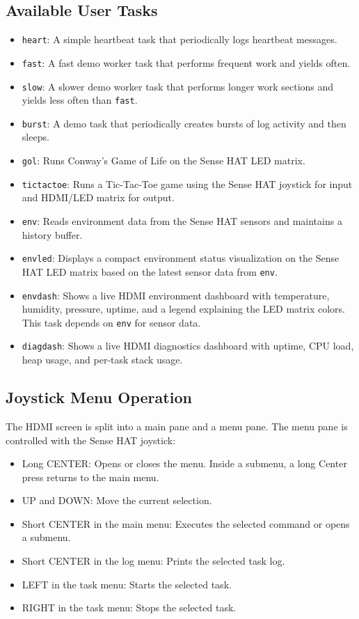 \subsection{Available User Tasks}
\begin{itemize}
    \item \texttt{heart}: A simple heartbeat task that periodically logs heartbeat messages.
    \item \texttt{fast}: A fast demo worker task that performs frequent work and yields often.
    \item \texttt{slow}: A slower demo worker task that performs longer work sections and yields less often than \texttt{fast}.
    \item \texttt{burst}: A demo task that periodically creates bursts of log activity and then sleeps.
    \item \texttt{gol}: Runs Conway's Game of Life on the Sense HAT LED matrix.
    \item \texttt{tictactoe}: Runs a Tic-Tac-Toe game using the Sense HAT joystick for input and HDMI/LED matrix for output.
    \item \texttt{env}: Reads environment data from the Sense HAT sensors and maintains a history buffer.
    \item \texttt{envled}: Displays a compact environment status visualization on the Sense HAT LED matrix based on the latest sensor data from \texttt{env}.
    \item \texttt{envdash}: Shows a live HDMI environment dashboard with temperature, humidity, pressure, uptime, and a legend explaining the LED matrix colors. This task depends on \texttt{env} for sensor data.
    \item \texttt{diagdash}: Shows a live HDMI diagnostics dashboard with uptime, CPU load, heap usage, and per-task stack usage.
\end{itemize}

\subsection{Joystick Menu Operation}

The HDMI screen is split into a main pane and a menu pane. The menu pane is controlled with the Sense HAT joystick:
\begin{itemize}
  \item Long CENTER: Opens or closes the menu. Inside a submenu, a long Center press returns to the main menu.
  \item UP and DOWN: Move the current selection.
  \item Short CENTER in the main menu: Executes the selected command or opens a submenu.
  \item Short CENTER in the log menu: Prints the selected task log.
  \item LEFT in the task menu: Starts the selected task.
  \item RIGHT in the task menu: Stops the selected task.
\end{itemize}


